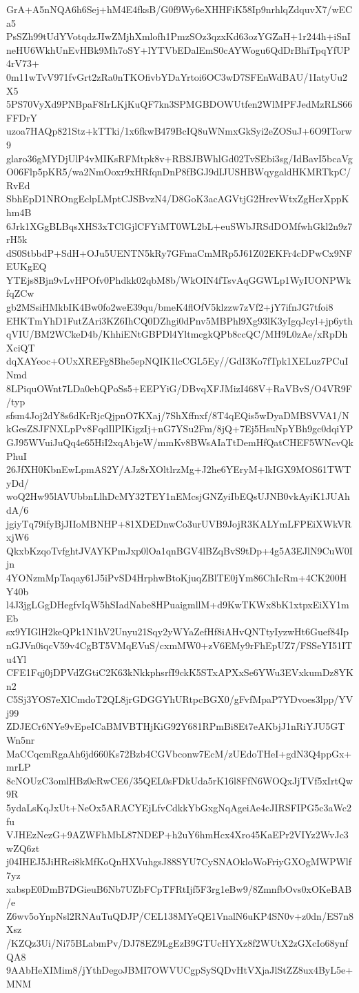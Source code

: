 GrA+A5nNQA6h6Sej+hM4E4fksB/G0f9Wy6eXHHFiK58Ip9nrhlqZdquvX7/wECa5
PsSZh99tUdYVotqdzJIwZMjhXmlofh1PmzSOz3qzxKd63ozYGZaH+1r244h+iSnI
neHU6WkhUnEvHBk9Mh7oSY+lYTVbEDalEmS0cAYWogu6QdDrBhiTpqYfUP4rV73+
0m11wTvV971fvGrt2zRa0nTKOfivbYDaYrtoi6OC3wD7SFEnWdBAU/1IatyUu2X5
5PS70VyXd9PNBpaF8IrLKjKuQF7kn3SPMGBDOWUtfen2WlMPFJedMzRLS66FFDrY
uzoa7HAQp821Stz+kTTki/1x6fkwB479BcIQ8uWNmxGkSyi2eZOSuJ+6O9ITorw9
glaro36gMYDjUlP4vMIKsRFMtpk8v+RBSJBWhlGd02TvSEbi3sg/IdBavI5bcaVg
O06Flp5pKR5/wa2NmOoxr9xHRfqnDnP8fBGJ9dIJUSHBWqygaldHKMRTkpC/RvEd
SbhEpD1NROngEclpLMptCJSBvzN4/D8GoK3acAGVtjG2HrcvWtxZgHcrXppKhm4B
6Jrk1XGgBLBqsXHS3xTClGjlCFYiMT0WL2bL+euSWbJRSdDOMfwhGkl2n9z7rH5k
dS0StbbdP+SdH+OJu5UENTN5kRy7GFmaCmMRp5J61Z02EKFr4cDPwCx9NFEUKgEQ
YTEjs8Bjn9vLvHPOfv0Phdkk02qbM8b/WkOIN4fTsvAqGGWLp1WyIUONPWkfqZCw
gb2MSsiHMkbIK4Bw0fo2weE39qu/bmeK4flOfV5klzzw7zVf2+jY7ifnJG7tfoi8
EHKTmYhD1FutZAri3KZ6IhCQ0DZhgi0dPnv5MBPhl9Xg93lK3yIgqJcyl+jp6yth
qVIU/BM2WCkeD4b/KhhiENtGBPDl4YltmcgkQPb8ccQC/MH9L0zAe/xRpDhXciQT
dqXAYeoc+OUxXREFg8Bhe5epNQIK1lcCGL5Ey//GdI3Ko7fTpk1XELuz7PCuINmd
8LPiquOWnt7LDa0ebQPoSs5+EEPYiG/DBvqXFJMizI468V+RaVBvS/O4VR9F/typ
sfsm4Joj2dY8s6dKrRjcQjpnO7KXaj/7ShXffnxf/8T4qEQis5wDyaDMBSVVA1/N
kGesZSJFNXLpPv8FqdIlPIKigzIj+nG7YSu2Fm/8jQ+7Ej5HsuNpYBh9gc0dqiYP
GJ95WVuiJuQq4e65HiI2xqAbjeW/mmKv8BWsAIaTtDemHfQatCHEF5WNcvQkPhuI
26JfXH0KbnEwLpmAS2Y/AJz8rXOltlrzMg+J2he6YEryM+lkIGX9MOS61TWTyDd/
woQ2Hw95lAVUbbnLlhDcMY32TEY1nEMcsjGNZyiIbEQsUJNB0vkAyiK1JUAhdA/6
jgiyTq79ifyBjJIIoMBNHP+81XDEDnwCo3urUVB9JojR3KALYmLFPEiXWkVRxjW6
QkxbKzqoTvfghtJVAYKPmJxp0lOa1qnBGV4lBZqBvS9tDp+4g5A3EJlN9CuW0Ijn
4YONzmMpTaqay61J5iPvSD4HrphwBtoKjuqZBlTE0jYm86ChIcRm+4CK200HY40b
l4J3jgLGgDHegfvIqW5hSIadNabe8HPuaigmllM+d9KwTKWx8bK1xtpxEiXY1mEb
sx9YIGlH2keQPk1N1hV2Unyu21Sqy2yWYaZefHf8iAHvQNTtyIyzwHt6Guef84Ip
nGJVn0iqcV59v4CgBT5VMqEVuS/cxmMW0+zV6EMy9rFhEpUZ7/FSSeYI51ITu4Yl
CFE1Fqj0jDPVdZGtiC2K63kNkkphsrfI9ckK5STxAPXxSe6YWu3EVxkumDz8YKn2
C5Sj3YOS7eXlCmdoT2QL8jrGDGGYhURtpcBGX0/gFvfMpaP7YDvoes3lpp/YVj99
ZDJECr6NYe9vEpeICaBMVBTHjKiG92Y681RPmBi8Et7eAKbjJ1nRiYJU5GTWn5nr
MaCCqcmRgaAh6jd660Ks72Bzb4CGVbconw7EcM/zUEdoTHeI+gdN3Q4ppGx+mrLP
8cNOUzC3omlHBz0cRwCE6/35QEL0sFDkUda5rK16l8FfN6WOQxJjTVf5xIrtQw9R
5ydaLsKqJxUt+NeOx5ARACYEjLfvCdkkYbGxgNqAgeiAe4cJIRSFIPG5c3aWc2fu
VJHEzNezG+9AZWFhMbL87NDEP+h2uY6hmHcx4Xro45KaEPr2VIYz2WvJc3wZQ6zt
j04IHEJ5JiHRci8kMfKoQnHXVuhgsJ88SYU7CySNAOkloWoFriyGXOgMWPWlf7yz
xabspE0DmB7DGieuB6Nb7UZbFCpTFRtIjf5F3rg1eBw9/8ZmnfbOvs0xOKeBAB/e
Z6wv5oYnpNsl2RNAuTuQDJP/CEL138MYeQE1VnalN6uKP4SN0v+z0dn/ES7n8Xsz
/KZQz3Ui/Ni75BLabmPv/DJ78EZ9LgEzB9GTUcHYXz8f2WUtX2zGXcIo68ynfQA8
9AAbHeXIMim8/jYthDegoJBMI7OWVUCgpSySQDvHtVXjaJlStZZ8ux4ByL5e+MNM
